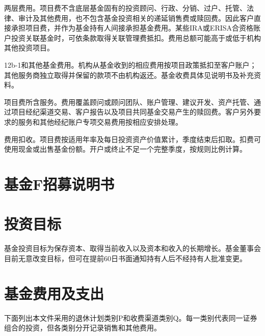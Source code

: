 \documentclass[UTF8,fontset=none,11pt,a4paper]{ctexart}
\begin{document}
两层费用。项目费不含底层基金固有的投资顾问、行政、分销、过户、托管、法律、审计及其他费用，也不包含基金投资相关的递延销售费或赎回费。因此客户直接承担项目费，并作为基金持有人间接承担基金费用。某些IRA或ERISA合资格账户投资关联基金时，可依条款取得关联管理费抵扣。费用总额可能高于或低于机构其他投资项目。


12b-1和其他基金费用。机构从基金收到的相应费用按项目政策抵扣至客户账户；其他服务商独立取得并保留的款项不由机构返还。基金收费具体见说明书及补充资料。


项目费所含服务。费用覆盖顾问或顾问团队、账户管理、建议开发、资产托管、通过项目经纪渠道交易、客户报告以及项目共同基金交易产生的赎回费。客户另外要求的服务和其他经纪账户专项交易费用按相应安排处理。


费用扣收。项目费按适用年率及每日投资资产价值累计，季度结束后扣取。扣费可使用现金或出售基金份额。开户或终止不足一个完整季度，按规则比例计算。


\section*{基金F招募说明书}
\section*{投资目标}
基金投资目标为保存资本、取得当前收入以及资本和收入的长期增长。基金董事会目前无意改变目标，但可在提前60日书面通知持有人后不经持有人批准变更。


\section*{基金费用及支出}
下面列出本文件采用的退休计划类别P和收费渠道类别Q。每一类别代表同一证券组合的投资，但各类别分开记录销售和其他费用。
\end{document}
